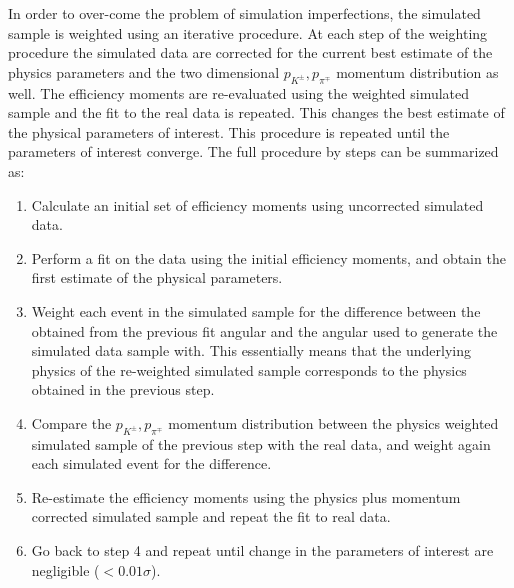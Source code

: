 In order to over-come the problem of simulation imperfections, the simulated sample is weighted using an iterative procedure.
At each step of the weighting procedure the simulated data are corrected for the current best estimate of the physics
parameters and the two dimensional $p_{K^{\pm}},p_{\pi^{\mp}}$ momentum distribution as well.
The efficiency moments are re-evaluated using the weighted simulated sample and the fit to the real data is repeated.
This changes the best estimate of the physical parameters of interest. This procedure is repeated until the parameters
of interest converge. The full procedure by steps can be summarized as:

\begin{enumerate}
\item Calculate an initial set of efficiency moments using uncorrected \BsJpsiKst simulated data.
\item Perform a fit on the \BsJpsiKst data using the initial efficiency moments, and obtain the first estimate of the physical parameters.
\item Weight each event in the simulated sample for the difference between the obtained from the previous fit angular \pdf and the angular \pdf used to
      generate the simulated data sample with.
      This essentially means that the underlying physics of the re-weighted simulated  sample corresponds to the physics obtained in the previous step.
\item Compare the $p_{K^{\pm}},p_{\pi^{\mp}}$ momentum distribution between the physics weighted simulated sample of the previous step with the
      real data, and weight again each simulated event for the difference.
\item Re-estimate the efficiency moments using the physics plus momentum corrected \BsJpsiKst simulated sample and repeat the fit to \BsJpsiKst real data.
\item Go back to step 4 and repeat until change in the parameters of interest are negligible ($<0.01\sigma$).
\end{enumerate}

